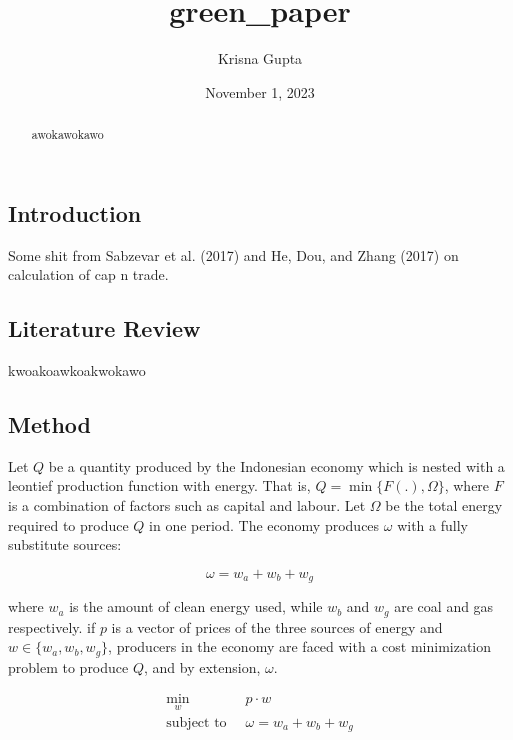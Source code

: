 \documentclass[
  a4paper,
  DIV=11,
  numbers=noendperiod]{scrartcl}
\title{green\_paper}
\author{Krisna Gupta}
\date{November 1, 2023}
\begin{document}
\maketitle
\begin{abstract}
awokawokawo
\end{abstract}
\ifdefined\Shaded\renewenvironment{Shaded}{\begin{tcolorbox}[breakable, interior hidden, boxrule=0pt, borderline west={3pt}{0pt}{shadecolor}, sharp corners, enhanced, frame hidden]}{\end{tcolorbox}}\fi

\hypertarget{introduction}{%
\subsection{Introduction}\label{introduction}}

Some shit from Sabzevar et al. (2017) and He, Dou, and Zhang (2017) on
calculation of cap n trade.

\hypertarget{literature-review}{%
\subsection{Literature Review}\label{literature-review}}

kwoakoawkoakwokawo

\hypertarget{method}{%
\subsection{Method}\label{method}}

Let \(Q\) be a quantity produced by the Indonesian economy which is
nested with a leontief production function with energy. That is,
\(Q=\min \{F(.),\Omega\}\), where \(F\) is a combination of factors such
as capital and labour. Let \(\Omega\) be the total energy required to
produce \(Q\) in one period. The economy produces \(\omega\) with a
fully substitute sources:

\[
\omega=w_a+w_b+w_g
\]

where \(w_a\) is the amount of clean energy used, while \(w_b\) and
\(w_g\) are coal and gas respectively. if \(p\) is a vector of prices of
the three sources of energy and \(w \in \{w_a,w_b,w_g\}\), producers in
the economy are faced with a cost minimization problem to produce \(Q\),
and by extension, \(\omega\).

\[
\begin{aligned}
\min_{w} \ &  p \cdot w \\
\mbox{subject to } \ & \omega=w_a+w_b+w_g
\end{aligned}
\]
\end{document}
